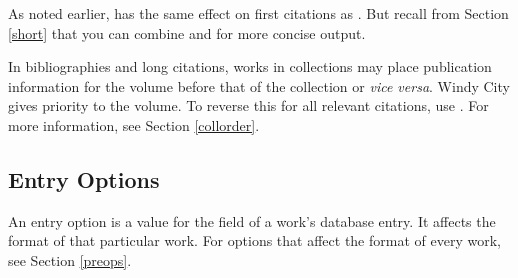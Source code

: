 \documentclass[11pt,letterpaper,oneside]{article}
\begin{document}
\begin{optionlist}
As noted earlier,  has the same effect on first citations
as . But recall from Section \ref{short} that you can
combine  and  for more concise output.


\noindent In bibliographies and long citations, works in collections
may place publication information for the volume before that of the
collection or \textit{vice versa}. Windy City gives priority to the
volume. To reverse this for all relevant citations, use .
For more information, see Section \ref{collorder}.

\end{optionlist}

\subsection{Entry Options}
\label{entryops}

An entry option is a value for the  field of a
work's database entry. It affects the format of that particular work.
For options that affect the format of every work, see Section
\ref{preops}.
\end{document}
